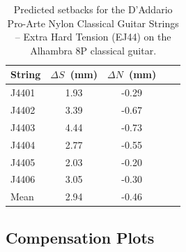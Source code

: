 \begin{table}%
  \centering
  \caption{\label{tbl:ej44_setbacks} Predicted setbacks for the D'Addario Pro-Arte Nylon Classical Guitar Strings -- Extra Hard Tension (EJ44) on the Alhambra 8P classical guitar.}
    \begin{tabular}{lcccc}
    \hline \hline
    String  & $\Delta S$~(mm) & $\Delta N$~(mm) \\
    \hline
    J4401 & 1.93 & -0.29 \\
    J4402 & 3.39 & -0.67 \\
    J4403 & 4.44 & -0.73 \\
    J4404 & 2.77 & -0.55 \\
    J4405 & 2.03 & -0.20 \\
    J4406 & 3.05 & -0.30 \\
    \hline \hline
    Mean & 2.94 & -0.46 \\
    \hline
    \end{tabular}%
  \label{tab:addlabel}%
\end{table}%

 \subsection{Compensation Plots}
 
